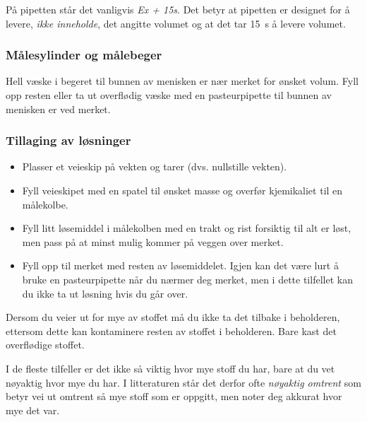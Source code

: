 	På pipetten står det vanligvis \emph{Ex + 15s}. Det betyr at pipetten er designet for å levere, \emph{ikke inneholde}, det angitte volumet og at det tar \SI{15}{s} å levere volumet. 
	
	\subsubsection{Målesylinder og målebeger}
	Hell væske i begeret til bunnen av menisken er nær merket for ønsket volum. Fyll opp resten eller ta ut overflødig væske med en pasteurpipette til bunnen av menisken er ved merket.
	
	\subsubsection{Tillaging av løsninger}
	\begin{itemize}
		\item Plasser et veieskip på vekten og tarer (dvs. nullstille vekten). 
		
		\item Fyll veieskipet med en spatel til ønsket masse og overfør kjemikaliet til en målekolbe. 
		
		\item Fyll litt løsemiddel i målekolben med en trakt og rist forsiktig til alt er løst, men pass på at minst mulig kommer på veggen over merket. 
		
		\item Fyll opp til merket med resten av løsemiddelet. Igjen kan det være lurt å bruke en pasteurpipette når du nærmer deg merket, men i dette tilfellet kan du ikke ta ut løsning hvis du går over.
	\end{itemize}

	Dersom du veier ut for mye av stoffet må du ikke ta det tilbake i beholderen, ettersom dette kan kontaminere resten av stoffet i beholderen. Bare kast det overflødige stoffet.
	
	I de fleste tilfeller er det ikke så viktig hvor mye stoff du har, bare at du vet nøyaktig hvor mye du har. I litteraturen står det derfor ofte \emph{nøyaktig omtrent} som betyr vei ut omtrent så mye stoff som er oppgitt, men noter deg akkurat hvor mye det var.
	
